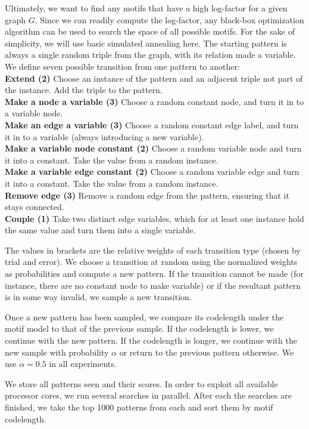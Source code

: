 \documentclass[letterpaper]{article} %
\begin{document}
Ultimately, we want to find any motifs that have a high log-factor for a given graph $G$. Since we can readily compute the log-factor, any black-box optimization algorithm can be used to search the space of all possible motifs. For the sake of simplicity, we will use basic simulated annealing here. The starting pattern is always a single random triple from the graph, with its relation made a variable. We define seven possible transition from one pattern to another: \\
\textbf{Extend (2)} Choose an instance of the pattern and an adjacent triple not part of the instance. Add the triple to the pattern.\\
\textbf{Make a node a variable (3)} Choose a random constant node, and turn it in to a variable node.\\
\textbf{Make an edge a variable (3)} Choose a random constant edge label, and turn it in to a variable (always introducing a new variable).\\
\textbf{Make a variable node constant (2)} Choose a random variable node and turn it into a constant. Take the value from a random instance.\\
\textbf{Make a variable edge constant (2)} Choose a random variable edge and turn it into a constant. Take the value from a random instance.\\
\textbf{Remove edge (3)} Remove a random edge from the pattern, ensuring that it stays connected.\\
\textbf{Couple (1)} Take two distinct edge variables, which for at least one instance hold the same value and turn them into a single variable.

The values in brackets are the relative weights of each transition type (chosen by trial and error). We choose a transition at random using the normalized weights as probabilities and compute a new pattern. If the transition cannot be made (for instance, there are no constant node to make variable) or if the resultant pattern is in some way invalid, we sample a new transition.

Once a new pattern has been sampled, we compare its codelength under the motif model to that of the previous sample. If the codelength is lower, we continue with the new pattern. If the codelength is longer, we continue with the new sample with probability $\alpha$ or return to the previous pattern otherwise. We use $\alpha = 0.5$ in all experiments.

We store all patterns seen and their scores. In order to exploit all available processor cores, we run several searches in parallel. After each the searches are finished, we take the top 1000 patterns from each and sort them by motif codelength. 
 
\end{document}
